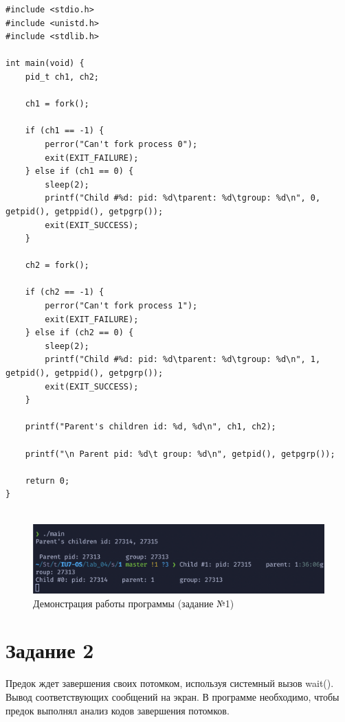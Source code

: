 \documentclass[a4paper,14pt]{article}
\begin{document}
\begin{lstlisting}[style=C, caption=Процессы-сироты.]
#include <stdio.h>
#include <unistd.h>
#include <stdlib.h>

int main(void) {
	pid_t ch1, ch2;

	ch1 = fork();

	if (ch1 == -1) {
		perror("Can't fork process 0");
		exit(EXIT_FAILURE);
	} else if (ch1 == 0) {
		sleep(2);
		printf("Child #%d: pid: %d\tparent: %d\tgroup: %d\n", 0, getpid(), getppid(), getpgrp());
		exit(EXIT_SUCCESS);
	}

	ch2 = fork();

	if (ch2 == -1) {
		perror("Can't fork process 1");
		exit(EXIT_FAILURE);
	} else if (ch2 == 0) {
		sleep(2);
		printf("Child #%d: pid: %d\tparent: %d\tgroup: %d\n", 1, getpid(), getppid(), getpgrp());
		exit(EXIT_SUCCESS);
	}

	printf("Parent's children id: %d, %d\n", ch1, ch2);

	printf("\n Parent pid: %d\t group: %d\n", getpid(), getpgrp());

	return 0;
}
	
\end{lstlisting}

\begin{figure}[ht]
	\centering
	\includegraphics[scale=0.7]{1.png}
	\caption{Демонстрация работы программы (задание №1)}
	\label{fig:1}
\end{figure}

\clearpage
\section*{Задание 2}

Предок ждет завершения своих потомком, используя системный вызов wait(). Вывод соответствующих сообщений на экран. В программе необходимо, чтобы предок выполнял анализ кодов завершения потомков.
\end{document}
